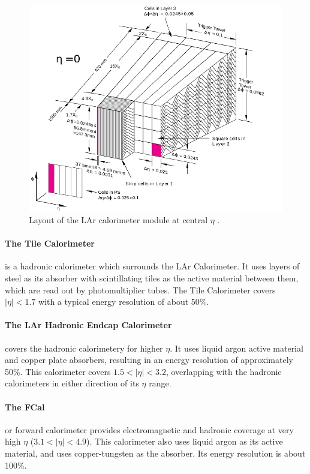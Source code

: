 \begin{centering}
\begin{figure}[!htb]
\myfloatalign
\includegraphics[width=.90\linewidth]{figures/atlas/LARG3-TDR-barrelM_samplings_presamp_new.png}
\caption{Layout of the LAr calorimeter module at central $\eta$ \cite{PERF-2007-01}.}
\label{fig:calo_mod}
\end{figure}
\end{centering}

\paragraph{The Tile Calorimeter} is a hadronic calorimeter which surrounds the LAr Calorimeter. It uses layers of steel as its absorber with scintillating tiles as the active material between them, which are read out by photomultiplier tubes. The Tile Calorimeter covers $|\eta| < 1.7$ with a typical energy resolution of about 50\%. 

\paragraph{The LAr Hadronic Endcap Calorimeter} covers the hadronic calorimetery for higher $\eta$. It uses liquid argon active material and copper plate absorbers, resulting in an energy resolution of approximately 50\%. This calorimeter covers $1.5 < |\eta| < 3.2$, overlapping with the hadronic calorimeters in either direction of its $\eta$ range. 

\paragraph{The FCal} or forward calorimeter provides electromagnetic and hadronic coverage at very high $\eta$ ($3.1 < |\eta| < 4.9$). This calorimeter also uses liquid argon as its active material, and uses copper-tungsten as the absorber. Its energy resolution is about 100\%.

